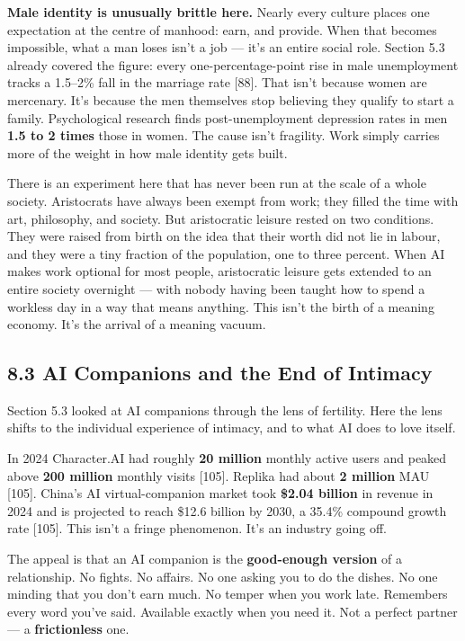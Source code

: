 \documentclass[11pt,a4paper]{article}
\begin{document}
\textbf{Male identity is unusually brittle here.} Nearly every culture places one expectation at the centre of manhood: earn, and provide. When that becomes impossible, what a man loses isn't a job --- it's an entire social role. Section 5.3 already covered the figure: every one-percentage-point rise in male unemployment tracks a 1.5--2\% fall in the marriage rate [88]. That isn't because women are mercenary. It's because the men themselves stop believing they qualify to start a family. Psychological research finds post-unemployment depression rates in men \textbf{1.5 to 2 times} those in women. The cause isn't fragility. Work simply carries more of the weight in how male identity gets built.

There is an experiment here that has never been run at the scale of a whole society. Aristocrats have always been exempt from work; they filled the time with art, philosophy, and society. But aristocratic leisure rested on two conditions. They were raised from birth on the idea that their worth did not lie in labour, and they were a tiny fraction of the population, one to three percent. When AI makes work optional for most people, aristocratic leisure gets extended to an entire society overnight --- with nobody having been taught how to spend a workless day in a way that means anything. This isn't the birth of a meaning economy. It's the arrival of a meaning vacuum.

\subsection{8.3 AI Companions and the End of Intimacy}

Section 5.3 looked at AI companions through the lens of fertility. Here the lens shifts to the individual experience of intimacy, and to what AI does to love itself.

In 2024 Character.AI had roughly \textbf{20 million} monthly active users and peaked above \textbf{200 million} monthly visits [105]. Replika had about \textbf{2 million} MAU [105]. China's AI virtual-companion market took \textbf{\$2.04 billion} in revenue in 2024 and is projected to reach \$12.6 billion by 2030, a 35.4\% compound growth rate [105]. This isn't a fringe phenomenon. It's an industry going off.

The appeal is that an AI companion is the \textbf{good-enough version} of a relationship. No fights. No affairs. No one asking you to do the dishes. No one minding that you don't earn much. No temper when you work late. Remembers every word you've said. Available exactly when you need it. Not a perfect partner --- a \textbf{frictionless} one.
\end{document}
